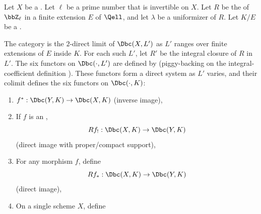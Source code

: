 \begin{definition} \label{definition:six_functor_formalism_on_derived_category_of_bdd_constr_complexes_with_algebraic_coefficients_on_a_noetherian_scheme}
    Let $X$ be a . Let $\ell$ be a prime number that is invertible on $X$. Let $R$ be the  of $\bbZ_\ell$ in a finite extension $E$ of $\Qell$, and let $\lambda$ be a uniformizer of $R$. Let $K/E$ be a .

    The category  is the $2$-direct limit of $\Dbc(X,L')$ as $L'$ ranges over finite extensions of $E$ inside $K$. For each such $L'$, let $R'$ be the integral closure of $R$ in $L'$. The six functors on $\Dbc(\cdot, L')$ are defined by  (piggy-backing on the integral-coefficient definition ). These functors form a direct system as $L'$ varies, and their colimit defines the six functors on $\Dbc(\cdot, K)$:
    \begin{enumerate}
        \item $f^*: \Dbc(Y,K) \to \Dbc(X,K)$ (inverse image),

        \item If $f$ is an ,
        $$Rf_!: \Dbc(X,K) \to \Dbc(Y,K)$$
        (direct image with proper/compact support),

        \item For any morphism $f$, define
        $$Rf_*: \Dbc(X,K) \to \Dbc(Y,K)$$
        (direct image),

        \item On a single scheme $X$, define



\end{enumerate}
\end{definition}
